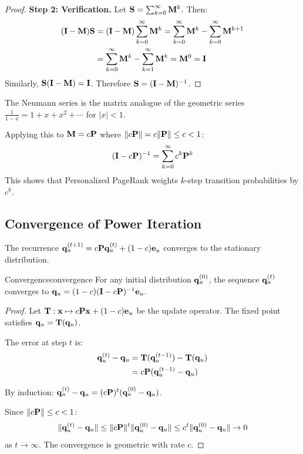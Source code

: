 \begin{notechapter}
\begin{proof}
\textbf{Step 2: Verification.} Let $\mathbf{S} = \sum_{k=0}^{\infty} \mathbf{M}^k$. Then:
\begin{align}
(\mathbf{I} - \mathbf{M}) \mathbf{S} &= (\mathbf{I} - \mathbf{M}) \sum_{k=0}^{\infty} \mathbf{M}^k = \sum_{k=0}^{\infty} \mathbf{M}^k - \sum_{k=0}^{\infty} \mathbf{M}^{k+1} \\
&= \sum_{k=0}^{\infty} \mathbf{M}^k - \sum_{k=1}^{\infty} \mathbf{M}^k = \mathbf{M}^0 = \mathbf{I}
\end{align}
Similarly, $\mathbf{S}(\mathbf{I} - \mathbf{M}) = \mathbf{I}$. Therefore $\mathbf{S} = (\mathbf{I} - \mathbf{M})^{-1}$.
\end{proof}

\begin{intuition}
The Neumann series is the matrix analogue of the geometric series $\frac{1}{1-x} = 1 + x + x^2 + \cdots$ for $|x| < 1$.

Applying this to $\mathbf{M} = c\mathbf{P}$ where $\|c\mathbf{P}\| = c\|\mathbf{P}\| \leq c < 1$:
\[
(\mathbf{I} - c\mathbf{P})^{-1} = \sum_{k=0}^{\infty} c^k \mathbf{P}^k
\]
This shows that Personalized PageRank weights $k$-step transition probabilities by $c^k$.
\end{intuition}

\subsection{Convergence of Power Iteration}
\label{random-walk-similarity:app:power-iteration}

The recurrence $\mathbf{q}_u^{(t+1)} = c\mathbf{P}\mathbf{q}_u^{(t)} + (1-c)\mathbf{e}_u$ converges to the stationary distribution.

\begin{proposition}{Convergence}{convergence}
For any initial distribution $\mathbf{q}_u^{(0)}$, the sequence $\mathbf{q}_u^{(t)}$ converges to $\mathbf{q}_u = (1-c)(\mathbf{I} - c\mathbf{P})^{-1}\mathbf{e}_u$.
\end{proposition}

\begin{proof}
Let $\mathbf{T}: \mathbf{x} \mapsto c\mathbf{P}\mathbf{x} + (1-c)\mathbf{e}_u$ be the update operator. The fixed point satisfies $\mathbf{q}_u = \mathbf{T}(\mathbf{q}_u)$.

The error at step $t$ is:
\begin{align}
\mathbf{q}_u^{(t)} - \mathbf{q}_u &= \mathbf{T}(\mathbf{q}_u^{(t-1)}) - \mathbf{T}(\mathbf{q}_u) \\
&= c\mathbf{P}(\mathbf{q}_u^{(t-1)} - \mathbf{q}_u)
\end{align}

By induction: $\mathbf{q}_u^{(t)} - \mathbf{q}_u = (c\mathbf{P})^t (\mathbf{q}_u^{(0)} - \mathbf{q}_u)$.

Since $\|c\mathbf{P}\| \leq c < 1$:
\[
\|\mathbf{q}_u^{(t)} - \mathbf{q}_u\| \leq \|c\mathbf{P}\|^t \|\mathbf{q}_u^{(0)} - \mathbf{q}_u\| \leq c^t \|\mathbf{q}_u^{(0)} - \mathbf{q}_u\| \to 0
\]
as $t \to \infty$. The convergence is geometric with rate $c$.
\end{proof}


\end{notechapter}
